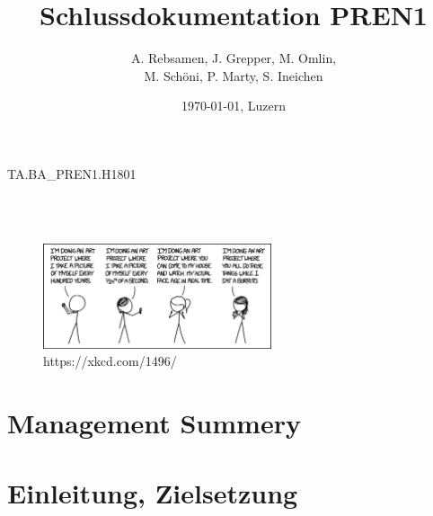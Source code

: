 \documentclass[11pt]{scrartcl}
\title{Schlussdokumentation PREN1}
\author{A. Rebsamen, J. Grepper, M. Omlin, \\ M. Schöni, P. Marty, S. Ineichen}
\date{\today{}, Luzern}
\begin{document}
        \begin{titlingpage}
            \begin{center}
                \begin{Huge} %
                    TA.BA{\_}PREN1.H1801 \\
                    \textbf{\thetitle} \\
                \end{Huge}
                \vspace{0.5cm}
                \begin{huge} %
                    \theauthor \\
                \end{huge}
                \vspace{0.5cm}
                \vspace{1cm}
                \begin{figure}[H] %
                    \centering
                    \includegraphics[width=0.6\textwidth]{images/comic.png}
                    \caption {https://xkcd.com/1496/}
                \end{figure}
                \vspace{0.5cm}
                \begin{huge} %
                    \thedate
                \end{huge}
            \end{center}
        \end{titlingpage}

        \tableofcontents
        \clearpage

        \section{Management Summery}
        
        \clearpage
        \section{Einleitung, Zielsetzung}
        
        \clearpage
\end{document}
